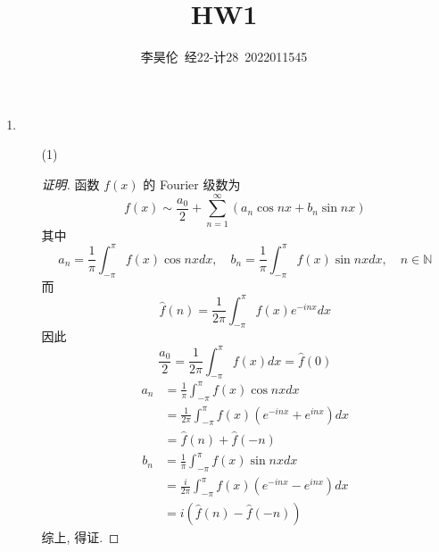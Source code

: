 \documentclass{article}
\title{HW1}
\author{李昊伦\ 经22-计28\ 2022011545}
\begin{document}
\maketitle
\begin{enumerate}
    \item \begin{enumerate}
        \item[(1)] \begin{proof}[证明]
            函数 $f(x)$ 的 Fourier 级数为\begin{equation}
                f(x)\sim\frac{a_0}{2}+\sum_{n=1}^{\infty}(a_n\cos nx+b_n\sin nx)
            \end{equation}
            其中\begin{equation}
                a_n=\frac{1}{\pi}\int_{-\pi}^{\pi}f(x)\cos nx dx,\quad b_n=\frac{1}{\pi}\int_{-\pi}^{\pi}f(x)\sin nx dx,\quad n\in \mathbb{N}
            \end{equation}
            而\begin{equation}
                \hat{f}(n)=\frac{1}{2\pi}\int_{-\pi}^{\pi}f(x)e^{-inx}dx
            \end{equation}
            因此\begin{equation}
                \frac{a_0}{2}=\frac{1}{2\pi}\int_{-\pi}^{\pi}f(x)dx=\hat{f}(0)
            \end{equation}
            \begin{equation}
                \begin{aligned}
                    a_n
                    &=\frac{1}{\pi}\int_{-\pi}^{\pi}f(x)\cos nx dx \\
                    &=\frac{1}{2\pi}\int_{-\pi}^{\pi}f(x)(e^{-inx}+e^{inx})dx \\
                    &=\hat{f}(n)+\hat{f}(-n)
                \end{aligned}
            \end{equation}
            \begin{equation}
                \begin{aligned}
                    b_n
                    &=\frac{1}{\pi}\int_{-\pi}^{\pi}f(x)\sin nx dx \\
                    &=\frac{i}{2\pi}\int_{-\pi}^{\pi}f(x)(e^{-inx}-e^{inx})dx \\
                    &=i(\hat{f}(n)-\hat{f}(-n))
                \end{aligned}
            \end{equation}
            综上, 得证.
        \end{proof}

\end{enumerate}
\end{enumerate}
\end{document}
